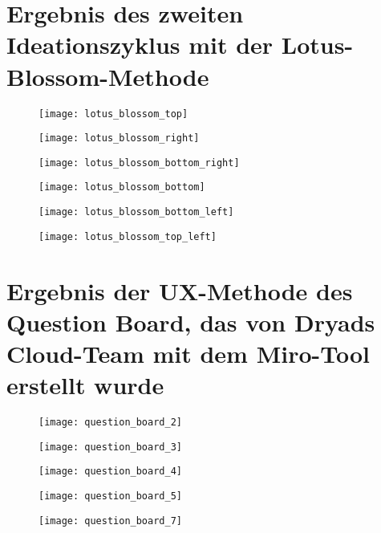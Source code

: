 
\section{Ergebnis des zweiten Ideationszyklus mit der Lotus-Blossom-Methode} \label{appendix:lotus_blossom}

\begin{figure}[H]
  \centering
  \texttt{[image: lotus\_blossom\_top]}
  \caption{}
  \label{fig:lotus_blossom_top}
\end{figure}
\begin{figure}[H]
  \centering
  \texttt{[image: lotus\_blossom\_right]}
  \caption{}
  \label{fig:lotus_blossom_right}
\end{figure}
\begin{figure}[H]
  \centering
  \texttt{[image: lotus\_blossom\_bottom\_right]}
  \caption{}
  \label{fig:lotus_blossom_bottom_right}
\end{figure}
\begin{figure}[H]
  \centering
  \texttt{[image: lotus\_blossom\_bottom]}
  \caption{}
  \label{fig:lotus_blossom_bottom}
\end{figure}
\begin{figure}[H]
  \centering
  \texttt{[image: lotus\_blossom\_bottom\_left]}
  \caption{}
  \label{fig:lotus_blossom_bottom_left}
\end{figure}
\begin{figure}[H]
  \centering
  \texttt{[image: lotus\_blossom\_top\_left]}
  \caption{}
  \label{fig:lotus_blossom_top_left}
\end{figure}

\section{Ergebnis der UX-Methode des Question Board, das von Dryads Cloud-Team mit dem Miro-Tool erstellt wurde} \label{appendix:question_board}

\begin{figure}[H]
  \centering
  \texttt{[image: question\_board\_2]}
  \caption{}
  \label{fig:question_board_2}
\end{figure}
\begin{figure}[H]
  \centering
  \texttt{[image: question\_board\_3]}
  \caption{}
  \label{fig:question_board_3}
\end{figure}
\begin{figure}[H]
  \centering
  \texttt{[image: question\_board\_4]}
  \caption{}
  \label{fig:question_board_4}
\end{figure}
\begin{figure}[H]
  \centering
  \texttt{[image: question\_board\_5]}
  \caption{}
  \label{fig:question_board_5}
\end{figure}
\begin{figure}[H]
  \centering
  \texttt{[image: question\_board\_7]}
  \caption{}
  \label{fig:question_board_7}
\end{figure}

